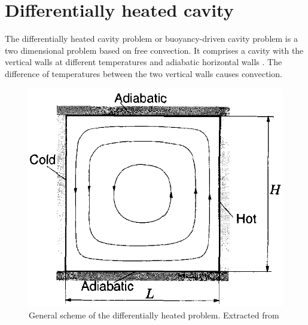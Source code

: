 \chapter{Differentially heated cavity}

The differentially heated cavity problem or buoyancy-driven cavity problem is a two dimensional problem based on free convection. It comprises a cavity with the vertical walls at different temperatures and adiabatic horizontal walls \cite{DeVahlDavis1983a, DeVahlDavis1983}. The difference of temperatures between the two vertical walls causes convection.

\begin{figure}[h]
	\centering
	\includegraphics[scale=0.5]{Buoyancy/BuoyancyDriven}
	\caption[General scheme of the differentially heated problem]{General scheme of the differentially heated problem. Extracted from \cite{Ferziger2002}}
\end{figure}

